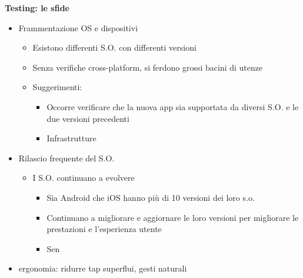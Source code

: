 \par \textbf{Testing: le sfide}
\begin{itemize}
    \item Frammentazione OS e dispositivi
    \begin{itemize}
        \item Esistono differenti S.O. con differenti versioni
        \item Senza verifiche cross-platform, si ferdono grossi bacini di utenze
        \item Suggerimenti:
        \begin{itemize}
            \item Occorre verificare che la nuova app sia supportata da diversi S.O. e le due versioni precedenti 
            \item Infrastrutture
        \end{itemize}
    \end{itemize}
    \item Rilascio frequente del S.O.
    \begin{itemize}
        \item I S.O. continuano a evolvere
        \begin{itemize}
            \item Sia Android che iOS hanno più di 10 versioni dei loro s.o.
            \item Continuano a migliorare e aggiornare le loro versioni per migliorare le prestazioni e l'esperienza utente
            \item Sen
        \end{itemize}
    \end{itemize}
    \item ergonomia: ridurre tap superflui, gesti naturali
\end{itemize}